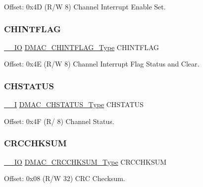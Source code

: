 Offset\+: 0x4D (R/W 8) Channel Interrupt Enable Set. 

\mbox{\label{struct_dmac_a70ede4f59f6bbe9db017cabb7d6e8a1e}} 
\subsubsection{\texorpdfstring{CHINTFLAG}{CHINTFLAG}}
{\footnotesize\ttfamily \mbox{\hyperlink{core__cm0plus_8h_aec43007d9998a0a0e01faede4133d6be}{\+\_\+\+\_\+\+IO}} \mbox{\hyperlink{union_d_m_a_c___c_h_i_n_t_f_l_a_g___type}{D\+M\+A\+C\+\_\+\+C\+H\+I\+N\+T\+F\+L\+A\+G\+\_\+\+Type}} C\+H\+I\+N\+T\+F\+L\+AG}



Offset\+: 0x4E (R/W 8) Channel Interrupt Flag Status and Clear. 

\mbox{\label{struct_dmac_ab0c06a8ab70dab542d1320d903c643ba}} 
\subsubsection{\texorpdfstring{CHSTATUS}{CHSTATUS}}
{\footnotesize\ttfamily \mbox{\hyperlink{core__cm0plus_8h_af63697ed9952cc71e1225efe205f6cd3}{\+\_\+\+\_\+I}} \mbox{\hyperlink{union_d_m_a_c___c_h_s_t_a_t_u_s___type}{D\+M\+A\+C\+\_\+\+C\+H\+S\+T\+A\+T\+U\+S\+\_\+\+Type}} C\+H\+S\+T\+A\+T\+US}



Offset\+: 0x4F (R/ 8) Channel Status. 

\mbox{\label{struct_dmac_a2ff786653f028d384972f7802372be87}} 
\subsubsection{\texorpdfstring{CRCCHKSUM}{CRCCHKSUM}}
{\footnotesize\ttfamily \mbox{\hyperlink{core__cm0plus_8h_aec43007d9998a0a0e01faede4133d6be}{\+\_\+\+\_\+\+IO}} \mbox{\hyperlink{union_d_m_a_c___c_r_c_c_h_k_s_u_m___type}{D\+M\+A\+C\+\_\+\+C\+R\+C\+C\+H\+K\+S\+U\+M\+\_\+\+Type}} C\+R\+C\+C\+H\+K\+S\+UM}



Offset\+: 0x08 (R/W 32) C\+RC Checksum. 

